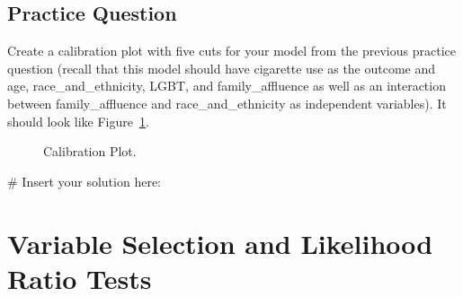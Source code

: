 \documentclass[
  letterpaper,
]{latex/krantz}
\makeatletter
\newenvironment{Shaded}{\begin{snugshade}}{\end{snugshade}}
\newcommand{\CommentTok}[1]{\textcolor[rgb]{0.37,0.37,0.37}{#1}}
\newenvironment{kframe}{%
\medskip{}
\setlength{\fboxsep}{.8em}
 \def\at@end@of@kframe{}%
 \ifinner\ifhmode%
  \def\at@end@of@kframe{\end{minipage}}%
  \begin{minipage}{\columnwidth}%
 \fi\fi%
 \def\FrameCommand##1{\hskip\@totalleftmargin \hskip-\fboxsep
 \colorbox{shadecolor}{##1}\hskip-\fboxsep
     \hskip-\linewidth \hskip-\@totalleftmargin \hskip\columnwidth}%
 \MakeFramed {\advance\hsize-\width
   \@totalleftmargin\z@ \linewidth\hsize
   \@setminipage}}%
 {\par\unskip\endMakeFramed%
 \at@end@of@kframe}
\renewenvironment{Shaded}{\begin{kframe}}{\end{kframe}}
\makeatother
\begin{document}
\subsection{Practice Question}\label{practice-question-24}

Create a calibration plot with five cuts for your model from the
previous practice question (recall that this model should have cigarette
use as the outcome and age, race\_and\_ethnicity, LGBT, and
family\_affluence as well as an interaction between family\_affluence
and race\_and\_ethnicity as independent variables). It should look like
Figure~\ref{fig-calibration-plot}.

\begin{figure}


\caption{\label{fig-calibration-plot}Calibration Plot.}

\end{figure}%

\begin{Shaded}
\begin{Highlighting}[]
\CommentTok{\# Insert your solution here:}
\end{Highlighting}
\end{Shaded}

\section{\texorpdfstring{Variable Selection and Likelihood Ratio Tests
}{Variable Selection and Likelihood Ratio Tests  }}\label{variable-selection-and-likelihood-ratio-tests}
\end{document}
